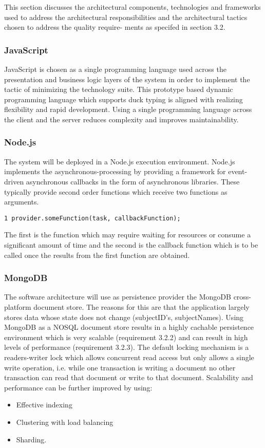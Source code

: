 This section discusses the architectural components, technologies and frameworks used to address
the architectural responsibilities and the architectural tactics chosen to address the quality require-
ments as specifed in section 3.2.

\subsubsection{JavaScript}
JavaScript is chosen as a single programming language used across the presentation and business
logic layers of the system in order to implement the tactic of minimizing the technology suite. This prototype based dynamic programming language which supports duck typing is aligned with realizing flexibility and rapid development. Using a single programming language across the client and the server reduces complexity and improves maintainability.

\subsubsection{Node.js}
The system will be deployed in a Node.js execution environment. Node.js implements the asynchronous-processing by providing a framework for event-driven asynchronous callbacks in the form of asynchronous libraries. These typically provide second order functions which receive two functions as arguments. 
\begin{lstlisting}
1 provider.someFunction(task, callbackFunction);
\end{lstlisting}
The first is the function which may require waiting for resources or consume a significant amount
of time and the second is the callback function which is to be called once the results from the first
function are obtained.

\subsubsection{MongoDB}
The software architecture will use as persistence provider the MongoDB cross-platform document store. The reasons for this are that the application largely stores data whose state does not change (subjectID's, subjectNames). Using MongoDB as a NOSQL document store results in a highly cachable persistence environment which is very scalable (requirement 3.2.2) and can result in high levels of performance (requirement 3.2.3). The default locking mechanism is a readers-writer lock which allows concurrent read access but only allows a single write operation, i.e. while one transaction is writing a document no other transaction can read that document or write to that document. Scalability and performance can be further improved by using:
\begin{itemize}
\item Effective indexing
\item Clustering with load balancing
\item Sharding.
\end{itemize}

